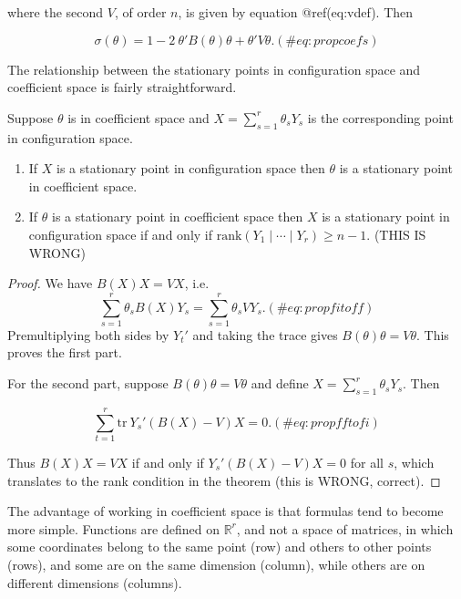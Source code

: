 \documentclass[
  12pt,
  letterpaper,
  DIV=11,
  numbers=noendperiod]{scrreprt}
\providecommand{\tightlist}{%
  \setlength{\itemsep}{0pt}\setlength{\parskip}{0pt}}\usepackage{longtable,booktabs,array}
\theoremstyle{remark}
\begin{document}
where the second \(V\), of order \(n\), is given by equation
@ref(eq:vdef). Then

\begin{equation}
\sigma(\theta)=1-2\ \theta'B(\theta)\theta+\theta'V\theta.
(\#eq:propcoefs)
\end{equation}

The relationship between the stationary points in configuration space
and coefficient space is fairly straightforward.

\label{confcoef}
Suppose \(\theta\) is in coefficient space and
\(X=\sum_{s=1}^r\theta_s Y_s\) is the corresponding point in
configuration space.

\begin{enumerate}
\def\labelenumi{\arabic{enumi}.}
\tightlist
\item
  If \(X\) is a stationary point in configuration space then \(\theta\)
  is a stationary point in coefficient space.
\item
  If \(\theta\) is a stationary point in coefficient space then \(X\) is
  a stationary point in configuration space if and only if
  \(\text{rank}(Y_1\mid\cdots\mid Y_r)\geq n-1\). (THIS IS WRONG)
\end{enumerate}

\begin{proof}
We have \(B(X)X=VX\), i.e.~ \begin{equation}
\sum_{s=1}^r \theta_s B(X)Y_s=\sum_{s=1}^r \theta_s VY_s.
(\#eq:propfitoff)
\end{equation} Premultiplying both sides by \(Y_t'\) and taking the
trace gives \(B(\theta)\theta=V\theta\). This proves the first part.

For the second part, suppose \(B(\theta)\theta=V\theta\) and define
\(X=\sum_{s=1}^r\theta_s Y_s\). Then

\begin{equation}
\sum_{t=1}^r\text{tr}\ Y_s'(B(X)-V)X=0.
(\#eq:propfftofi)
\end{equation}

Thus \(B(X)X=VX\) if and only if \(Y_s'(B(X)-V)X=0\) for all \(s\),
which translates to the rank condition in the theorem (this is WRONG,
correct).
\end{proof}

The advantage of working in coefficient space is that formulas tend to
become more simple. Functions are defined on \(\mathbb{R}^r\), and not a
space of matrices, in which some coordinates belong to the same point
(row) and others to other points (rows), and some are on the same
dimension (column), while others are on different dimensions (columns).
\end{document}
